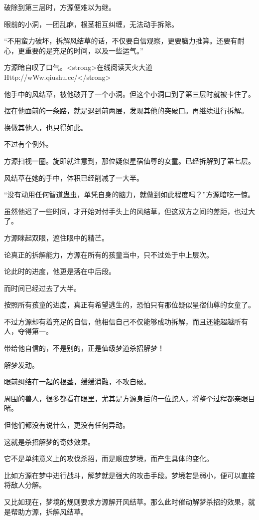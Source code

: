 \begin{this_body}
破除到第三层时，方源便难以为继。

眼前的小洞，一团乱麻，根茎相互纠缠，无法动手拆除。

“不用蛮力破坏，拆解风结草的话，不仅要自信观察，更要脑力推算。还要有耐心，更重要的是充足的时间，以及一些运气。”

方源暗自叹了口气。<strong>在线阅读天火大道Http://wWw.qiushu.cc/</strong>

他手中的风结草，被他破开了一个小洞。但这个小洞口到了第三层时就被卡住了。

摆在他面前的一条路，就是退到前两层，发现其他的突破口。再继续进行拆解。

换做其他人，也只得如此。

不过有个例外。

方源扫视一圈。旋即就注意到，那位疑似星宿仙尊的女童。已经拆解到了第七层。

风结草在她的手中，体积已经削减了一大半。

“没有动用任何智道蛊虫，单凭自身的脑力，就做到如此程度吗？”方源暗吃一惊。

虽然他迟了一些时间，才开始对付手头上的风结草，但这双方之间的差距，也过大了。

方源眯起双眼，遮住眼中的精芒。

论真正的拆解能力，方源在所有的孩童当中，只不过处于中上层次。

论此时的进度，他更是落在中后段。

而时间已经过去了大半。

按照所有孩童的进度，真正有希望逃生的，恐怕只有那位疑似星宿仙尊的女童了。

不过方源却有着充足的自信，他相信自己不仅能够成功拆解，而且还能超越所有人，夺得第一。

带给他自信的，不是别的，正是仙级梦道杀招解梦！

解梦发动。

眼前纠结在一起的根茎，缓缓消融，不攻自破。

周围的兽人，很多都看在眼里，尤其是方源身后的一位蛇人，将整个过程都亲眼目睹。

但他们都没有说什么，更没有任何异动。

这就是杀招解梦的奇妙效果。

它不是单纯意义上的攻伐杀招，而是顺应梦境，而产生具体的变化。

比如方源在梦中进行战斗，解梦就是强大的攻击手段。梦境若是弱小，便可以直接将敌人分解。

又比如现在，梦境的规则要求方源解开风结草。那么此时催动解梦杀招的效果，就是帮助方源，拆解风结草。


\end{this_body}
